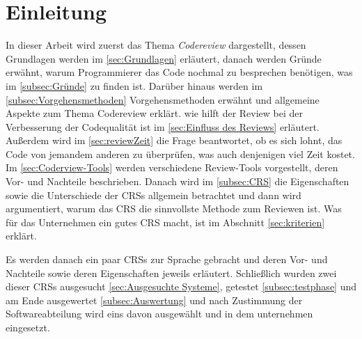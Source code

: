 \newpage
\listoftodos

\section{Einleitung}
\label{sec:Einleitung}

In dieser Arbeit wird zuerst das Thema \emph{Codereview} dargestellt, dessen Grundlagen werden im \cref{sec:Grundlagen} erläutert, danach werden Gründe erwähnt, warum Programmierer das Code nochmal zu besprechen benötigen, was im \cref{subsec:Gründe} zu finden ist. Darüber hinaus werden im \cref{subsec:Vorgehensmethoden} Vorgehensmethoden erwähnt und allgemeine Aspekte zum Thema Codereview erklärt. wie hilft der Review bei der Verbesserung der Codequalität ist im \cref{sec:Einfluss des Reviews} erläutert. Außerdem wird im \cref{sec:reviewZeit} die Frage beantwortet, ob es sich lohnt, das Code von jemandem anderen zu überprüfen, was auch denjenigen viel Zeit kostet.
Im \cref{sec:Coderview-Tools} werden verschiedene Review-Tools vorgestellt, deren Vor- und Nachteile beschrieben. Danach wird im \cref{subsec:CRS} die Eigenschaften sowie die Unterschiede der \acp{CRS} allgemein betrachtet und dann wird argumentiert, warum das \ac{CRS} die sinnvollste Methode zum Reviewen ist. Was für das Unternehmen ein gutes \ac{CRS} macht, ist im Abschnitt \ref{sec:kriterien} erklärt.

Es werden danach ein paar \acp{CRS} zur Sprache gebracht und deren Vor- und Nachteile sowie deren Eigenschaften jeweils erläutert. Schließlich wurden zwei dieser \acp{CRS} ausgesucht \cref{sec:Ausgesuchte Systeme}, getestet \cref{subsec:testphase} und am Ende ausgewertet \cref{subsec:Auswertung} und nach Zustimmung der Softwareabteilung wird eins davon ausgewählt und in dem unternehmen eingesetzt.
